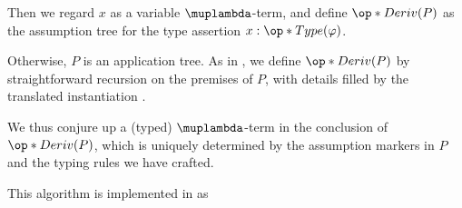 \begin{algorithm}
\begin{thmenum}
\begin{thmenum}
      Then we regard \( x \) as a variable \( \muplambda \)-term, and define \( \op*{Deriv}(P) \) as the assumption tree for the type assertion \( x: \op*{Type}(\varphi) \).

       Otherwise, \( P \) is an application tree. As in , we define \( \op*{Deriv}(P) \) by straightforward recursion on the premises of \( P \), with details filled by the translated instantiation .

      We thus conjure up a (typed) \( \muplambda \)-term in the conclusion of \( \op*{Deriv}(P) \), which is uniquely determined by the assumption markers in \( P \) and the typing rules we have crafted.
    \end{thmenum}
  \end{thmenum}
\end{algorithm}
\begin{comments}
  \item This algorithm is implemented in \cite{notebook:code} as
  \begin{CodeRefDisplay}
  \end{CodeRefDisplay}
\end{comments}

